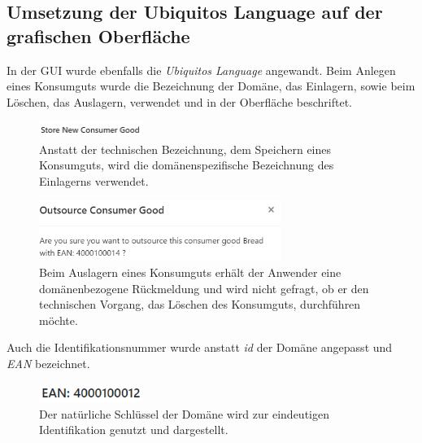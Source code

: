 \subsection*{Umsetzung der Ubiquitos Language auf der grafischen Oberfläche}
In der GUI wurde ebenfalls die \textit{Ubiquitos Language} angewandt.
Beim Anlegen eines Konsumguts wurde die Bezeichnung der Domäne, das Einlagern, sowie beim Löschen, das Auslagern, verwendet und in der Oberfläche beschriftet.

\begin{figure}[H]
	\centering
	\includegraphics[width=0.3\textwidth]{Bilder/gui/Ubiquitous Language/store-text.PNG}
	\caption[Überschrift Eingabemaske zum Einlagern eines Konsumguts.]{Anstatt der technischen Bezeichnung, dem Speichern eines Konsumguts, wird die domänenspezifische Bezeichnung des Einlagerns verwendet.}
	\label{fig:gui-titel-einlagern}
\end{figure}

\begin{figure}[H]
	\centering
	\includegraphics[width=0.7\textwidth]{Bilder/gui/Ubiquitous Language/outsource-text.PNG}
	\caption[Bezeichnung eines Auslagerungsvorgangs.]{Beim Auslagern eines Konsumguts erhält der Anwender eine domänenbezogene Rückmeldung und wird nicht gefragt, ob er den technischen Vorgang, das Löschen des Konsumguts, durchführen möchte.}
	\label{fig:gui-titel-auslagern}
\end{figure}

Auch die Identifikationsnummer wurde anstatt \textit{id} der Domäne angepasst und \textit{EAN} bezeichnet. 

\begin{figure}[H]
	\centering
	\includegraphics[width=0.3\textwidth]{Bilder/gui/Ubiquitous Language/ean.PNG}
	\caption[Darstellung EAN-Code.]{Der natürliche Schlüssel der Domäne wird zur eindeutigen Identifikation genutzt und dargestellt.}
	\label{fig:gui-darstellung-ean}
\end{figure}


